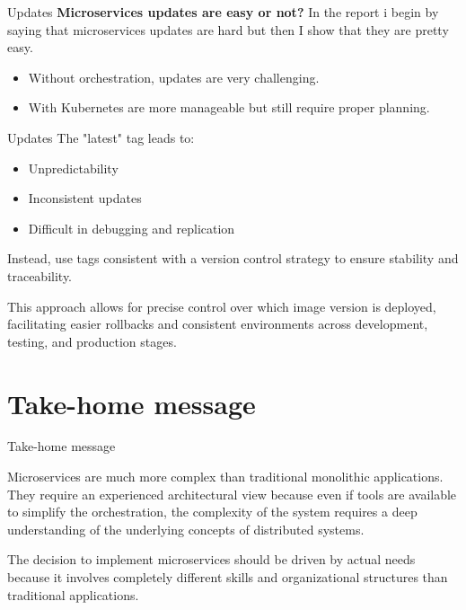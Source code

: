 \documentclass{beamer}
\begin{document}
\begin{frame}{Updates}
	\textbf{Microservices updates are easy or not?}
	In the report i begin by saying that microservices updates are hard but then I show that they are pretty easy.
	\begin{itemize}
		\item Without orchestration, updates are very challenging.
		\item With Kubernetes are more manageable but still require proper planning.
	\end{itemize}
\end{frame}
\begin{frame}{Updates}
	The "latest" tag leads to:
	\begin{itemize}
		\item Unpredictability
		\item Inconsistent updates
		\item Difficult in debugging and replication
	\end{itemize}
	\begin{block}{}
		Instead, use tags consistent with a version control strategy to ensure stability and traceability.
	\end{block}
	This approach allows for precise control over which image version is deployed, facilitating easier rollbacks and consistent environments across development, testing, and production stages.
\end{frame}

\section{Take-home message}
\begin{frame}{Take-home message}
	\begin{block}{}
		Microservices are much more complex than traditional monolithic applications. They require an experienced architectural view because even if tools are available to simplify the orchestration, the complexity of the system requires a deep understanding of the underlying concepts of distributed systems.
	\end{block}
	The decision to implement microservices should be driven by actual needs because it involves completely different skills and organizational structures than traditional applications.
\end{frame}
\end{document}
